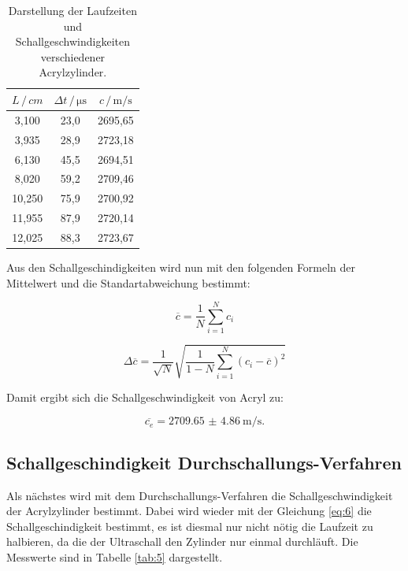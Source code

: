 \begin{table}[H]
  \centering
  \caption{Darstellung der Laufzeiten und Schallgeschwindigkeiten verschiedener
  Acrylzylinder.}
  \label{tab:4}
  \begin{tabular}{c c c}
    \toprule
    $L \, / \, cm$ & $\Delta t \, / \, \si{\micro\second}$ & $c \, / \, \si{\meter\per\second}$ \\
    \midrule
     3,100 & 23,0 & 2695,65 \\
     3,935 & 28,9 & 2723,18 \\
     6,130 & 45,5 & 2694,51 \\
     8,020 & 59,2 & 2709,46 \\
    10,250 & 75,9 & 2700,92 \\
    11,955 & 87,9 & 2720,14 \\
    12,025 & 88,3 & 2723,67 \\
    \bottomrule
  \end{tabular}
\end{table}

Aus den Schallgeschindigkeiten wird nun mit den folgenden Formeln der Mittelwert und
die Standartabweichung bestimmt:

\begin{equation}
  \overline{c} = \frac{1}{N} \sum_{i=1}^N c_i
  \label{eq:7}
\end{equation}

\begin{equation}
  \Delta \overline{c} = \frac{1}{\sqrt{N}} \sqrt{\frac{1}{1-N} \sum_{i=1}^N (c_i - \overline{c})^2}
  \label{eq:8}
\end{equation}

Damit ergibt sich die Schallgeschwindigkeit von Acryl zu:

\begin{equation*}
  \overline{c_e} = \SI{2709.65(486)}{\meter\per\second}.
\end{equation*}

\subsection{Schallgeschindigkeit Durchschallungs-Verfahren}

Als nächstes wird mit dem Durchschallungs-Verfahren die Schallgeschwindigkeit
der Acrylzylinder bestimmt. Dabei wird wieder mit der Gleichung \ref{eq:6} die
Schallgeschindigkeit bestimmt, es ist diesmal nur nicht nötig die Laufzeit zu halbieren,
da die der Ultraschall den Zylinder nur einmal durchläuft. Die Messwerte sind in
Tabelle \ref{tab:5} dargestellt.


